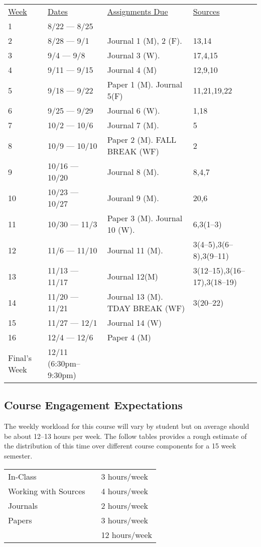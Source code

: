 \documentclass[nobib]{tufte-handout}
\begin{document}
\begin{center}
\begin{tabular}{llll}
\underline{Week} & \underline{Dates} & \underline{Assignments Due} & \underline{Sources} \\
1 & 8/22 --- 8/25 & &  \\
2 & 8/28 --- 9/1 & Journal 1 (M), 2 (F).  &  13,14 \\
3 & 9/4 --- 9/8 & Journal 3 (W). & 17,4,15 \\
4 & 9/11 --- 9/15 & Journal 4 (M) & 12,9,10 \\
5 & 9/18 --- 9/22 & Paper 1 (M). Journal 5(F) & 11,21,19,22 \\
6 & 9/25 --- 9/29 & Journal 6 (W). &  1,18 \\
7 & 10/2 --- 10/6 & Journal 7 (M). & 5 \\
8 & 10/9 --- 10/10 & Paper 2 (M). FALL BREAK (WF) & 2 \\
9 & 10/16 --- 10/20 & Journal 8 (M). & 8,4,7 \\
10 & 10/23 --- 10/27 & Jouranl 9 (M). & 20,6 \\
11 & 10/30 --- 11/3 & Paper 3 (M). Journal 10 (W). & 6,3(1--3) \\
12 & 11/6 --- 11/10 & Journal 11 (M). & 3(4--5),3(6--8),3(9--11) \\
13 & 11/13 --- 11/17 & Journal 12(M) &  3(12--15),3(16--17),3(18--19) \\
14 & 11/20 --- 11/21 & Journal 13 (M). TDAY BREAK (WF) & 3(20--22)\\
15 & 11/27 --- 12/1 & Journal 14 (W)  & \\
16 & 12/4 --- 12/6 & Paper 4 (M)  & \\
Final's Week & 12/11 (6:30pm--9:30pm) &  &  \\
\end{tabular}
\end{center}


\subsection{Course Engagement Expectations}

The weekly workload for this course will vary by student but on average should be about 12--13 hours per week.  The follow tables provides a rough estimate of the distribution of this time over different course components for a 15 week semester.

\begin{center}
\begin{tabular}{lll}
In-Class &      & 3 hours/week \\
Working with Sources &        & 4 hours/week \\
Journals &   & 2 hours/week \\
Papers &  & 3 hours/week \\

& & 12 hours/week \\

\end{tabular}
\end{center}
\end{document}
